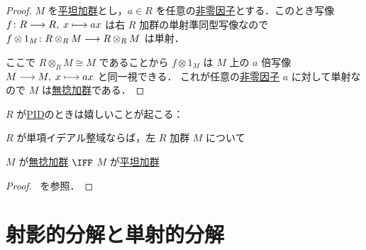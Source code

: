 \documentclass[algtopo_main]{subfiles}
\begin{document}
\begin{proof}
    $M$ を\hyperref[def:flat-mod]{平坦加群}とし，$a \in R$ を任意の\hyperref[def:non-zero-diviser]{非零因子}とする．このとき写像
    $f \colon R \longrightarrow R,\; x \longmapsto ax$ は右 $R$ 加群の単射準同型写像なので $f \otimes 1_M \colon R \otimes_R M \longrightarrow R \otimes_R M$ は単射．
    
    ここで $R \otimes_R M \cong M$ であることから $f \otimes 1_M$ は $M$ 上の $a$ 倍写像 $M \longrightarrow M,\; x \longmapsto ax$ と同一視できる．
    これが任意の\hyperref[def:non-zero-diviser]{非零因子} $a$ に対して単射なので $M$ は\hyperref[def:torsion-free-mod]{無捻加群}である．
\end{proof}


$R$ が\hyperref[def:PID]{PID}のときは嬉しいことが起こる：

\begin{myprop}[]{}
    $R$ が単項イデアル整域ならば，左 $R$ 加群 $M$ について

    $M$ が\hyperref[def:torsion-free-mod]{無捻加群} $\IFF$ $M$ が\hyperref[def:flat-mod]{平坦加群}
\end{myprop}

\begin{proof}
    ~\cite[命題1.109]{Shiho}を参照．
\end{proof}


\section{射影的分解と単射的分解}



    
\end{document}
